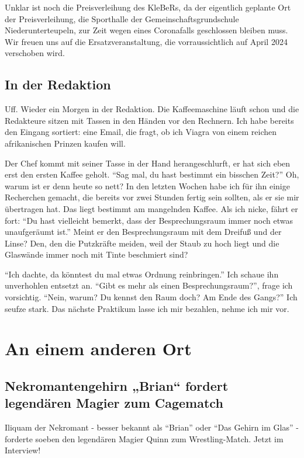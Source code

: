 \documentclass[final]{multiversum}
\begin{document}
Unklar ist noch die Preisverleihung des KleBeRs, da der eigentlich geplante Ort der Preisverleihung, die Sporthalle der Gemeinschaftsgrundschule Niederunterteupeln, zur Zeit wegen eines Coronafalls geschlossen bleiben muss.
Wir freuen uns auf die Ersatzveranstaltung, die vorraussichtlich auf April 2024 verschoben wird.

\subsection{In der Redaktion}
Uff. Wieder ein Morgen in der Redaktion.
Die Kaffeemaschine läuft schon und die Redakteure sitzen mit Tassen in den Händen vor den Rechnern.
Ich habe bereits den Eingang sortiert: eine Email, die fragt, ob ich Viagra von einem reichen afrikanischen Prinzen kaufen will.

Der Chef kommt mit seiner Tasse in der Hand herangeschlurft, er hat sich eben erst den ersten Kaffee geholt.
\enquote{Sag mal, du hast bestimmt ein bisschen Zeit?}
Oh, warum ist er denn heute so nett?
In den letzten Wochen habe ich für ihn einige Recherchen gemacht, die bereits vor zwei Stunden fertig sein sollten, als er sie mir übertragen hat.
Das liegt bestimmt am mangelnden Kaffee.
Als ich nicke, fährt er fort:
\enquote{Du hast vielleicht bemerkt, dass der Besprechungsraum immer noch etwas unaufgeräumt ist.}
Meint er den Besprechungsraum mit dem Dreifuß und der Linse?
Den, den die Putzkräfte meiden, weil der Staub zu hoch liegt und die Glaswände immer noch mit Tinte beschmiert sind?

 \enquote{Ich dachte, da könntest du mal etwas Ordnung reinbringen.}
 Ich schaue ihn unverhohlen entsetzt an.
 \enquote{Gibt es mehr als einen Besprechungsraum?}, frage ich vorsichtig.
 \enquote{Nein, warum? Du kennst den Raum doch? Am Ende des Gangs?}
 Ich seufze stark.
 Das nächste Praktikum lasse ich mir bezahlen, nehme ich mir vor.

\section{An einem anderen Ort}

\subsection{Nekromantengehirn „Brian“ fordert legendären Magier zum Cagematch}

Iliquam der Nekromant - besser bekannt als \enquote{Brian} oder \enquote{Das Gehirn im Glas} - forderte soeben den legendären Magier Quinn zum Wrestling-Match. Jetzt im Interview! 
\end{document}

